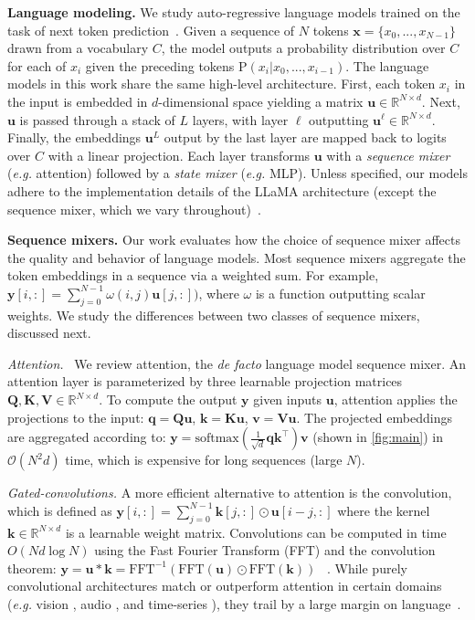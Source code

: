 \textbf{Language modeling.} We study auto-regressive language models trained on the task of next token prediction~\citep{pile}. Given a sequence of $N$ tokens $\bm{x} = \{x_0, ..., x_{N-1}\}$ drawn from a vocabulary $C$, the model outputs a probability distribution over $C$ for each of $x_i$ given the preceding tokens  $\mathrm{P}(x_{i}|x_0, ..., x_{i-1})$. The language models in this work share the same high-level architecture. First, each token $x_i$ in the input is embedded in $d$-dimensional space yielding a matrix $\bm{u} \in \mathbb{R}^{N \times d}$. Next, $\bm{u}$ is passed through a stack of $L$ layers, with layer $\ell$ outputting $\bm{u}^\ell \in \mathbb{R}^{N \times d}$. Finally, the embeddings $\bm{u}^L$ output by the last layer are mapped back to logits over $C$ with a linear projection. Each layer transforms $\bm{u}$ with a \textit{sequence mixer} (\textit{e.g.} attention) followed by a \textit{state mixer} (\textit{e.g.} MLP). Unless specified, our models adhere to the implementation details of the LLaMA architecture (except  the sequence mixer, which we vary throughout)~\citep{touvron2023llama}.

\textbf{Sequence mixers.}
\label{sec:prelim-architectures}
Our work evaluates how the choice of sequence mixer affects the quality and behavior of language models. Most sequence mixers aggregate the token embeddings in a sequence via a weighted sum. For example, $\bm{y}[i, :] = \sum_{j=0}^{N - 1} \omega(i, j) \bm{u}[j, :])$, where $\omega$ is a function outputting scalar weights. We study the differences between two classes of sequence mixers, discussed next.

\textit{Attention.}~\citep{vaswani2018attention} We review attention, the \textit{de facto} language model sequence mixer. An attention layer is parameterized by three learnable projection matrices $\mathbf{Q}, \mathbf{K}, \mathbf{V} \in \mathbb{R}^{N \times d}$. To compute the output $\bm{y}$ given inputs $\bm{u}$, attention applies the projections to the input: $\bm{q} = \mathbf{Q}\mathbf{u}$, $\bm{k} = \mathbf{K}\mathbf{u}$, $\bm{v} = \mathbf{V}\mathbf{u}$. The projected embeddings are aggregated according to:  $\bm{y} = \text{softmax}(\frac{1}{\sqrt{d}}\bm{q}\bm{k}^\top) \bm{v}$ (shown in \ref{fig:main}) in $\mathcal{O}(N^2d)$ time, which is expensive for long sequences (large $N$). 

\textit{Gated-convolutions.}
\label{sec:models}
A more efficient alternative to attention is the convolution, which is defined as $\bm{y}[i, :] = \sum_{j=0}^{N-1} \mathbf{k}[j, :] \odot \bm{u}[i - j, :]$  where the kernel $\mathbf{k} \in \mathbb{R}^{N \times d}$ is a learnable weight matrix. Convolutions can be computed in time $O(Nd \log N)$ using the Fast Fourier Transform (FFT) and the convolution theorem: $\bm{y} = \mathbf{u} \ast \mathbf{k} = \mathrm{FFT^{-1}(FFT(\mathbf{u}) \odot FFT(\mathbf{k}))}$ ~\citep{cooley1965algorithm}. While purely convolutional architectures match or outperform attention in certain domains (\textit{e.g.} vision \citep{tay2022efficient, gu2021efficiently}, audio \citep{goel2022its}, and time-series \citep{zhang2023effectively}), they trail by a large margin on language~\citep{dao2022hungry}. 

